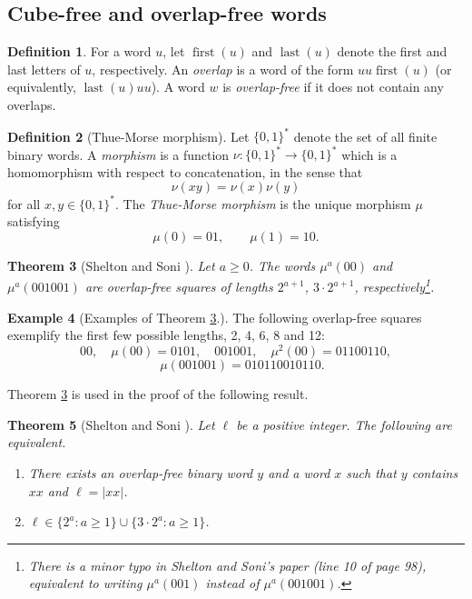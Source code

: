 \documentclass[12pt]{article}
\newcommand{\Cubefree}{Cube-free}
\newcommand{\abs}[1]{\lvert#1\rvert}
\theoremstyle{plain}
\newtheorem{thm}{Theorem}
\theoremstyle{definition}
\newtheorem{df}[thm]{Definition}
\newtheorem{exa}[thm]{Example}
\theoremstyle{remark}
\DeclareMathOperator{\first}{first}
\DeclareMathOperator{\last}{last}
\begin{document}
		\subsection{{\Cubefree} and overlap-free words}
			\begin{df}
				For a word $u$, let $\first(u)$ and $\last(u)$ denote the first
				and last letters of $u$, respectively.
				An \emph{overlap} is a word of the form $uu\first(u)$ (or equivalently, $\last(u)uu$).
				A word $w$ is \emph{overlap-free} if it does not contain any overlaps.
			\end{df}
			\begin{df}[Thue-Morse morphism]
				Let $\{0,1\}^*$ denote the set of all finite binary words.
				A \emph{morphism} is a function $\nu:\{0,1\}^*\rightarrow\{0,1\}^*$
				which is a homomorphism with respect to concatenation, in the sense that
				\[
					\nu(xy) = \nu(x)\nu(y)
				\]
				for all $x,y\in\{0,1\}^*$.
				The \emph{Thue-Morse morphism} is the unique morphism $\mu$ satisfying
				\[
					\mu(0) = 01,\qquad \mu(1) = 10.
				\]
			\end{df}
			\begin{thm}[Shelton and Soni \cite{MR787496}]\label{shelton}
				Let $a\ge 0$.
				The words $\mu^a(00)$ and $\mu^a(001001)$ are overlap-free squares of lengths $2^{a+1}$, $3\cdot 2^{a+1}$, respectively\footnote{
					There is a minor typo in Shelton and Soni's paper (line 10 of page 98),
					equivalent to writing $\mu^a(001)$ instead of $\mu^a(001001)$.
				}.
			\end{thm}
			\begin{exa}[Examples of Theorem \ref{shelton}.]
				The following overlap-free squares exemplify the first few possible lengths, 2, 4, 6, 8 and 12:
				\[
					00,\quad \mu(00)=0101,\quad 001001,\quad \mu^2(00)=01100110,
				\]
				\[
					\quad \mu(001001)=010110010110.
				\]
			\end{exa}
			Theorem \ref{shelton} is used in the proof of the following result.
			\begin{thm}[Shelton and Soni \cite{MR787496}]\label{soni}
				Let $\ell$ be a positive integer. The following are equivalent.
				\begin{enumerate}
					\item There exists an overlap-free binary word $y$ and a word $x$ such that $y$ contains $xx$ and $\ell=\abs{xx}$.
					\item $\ell\in \{2^a: a\ge 1\}\cup\{3\cdot 2^a:a\ge 1\}$.
				\end{enumerate}
			\end{thm}
\end{document}

